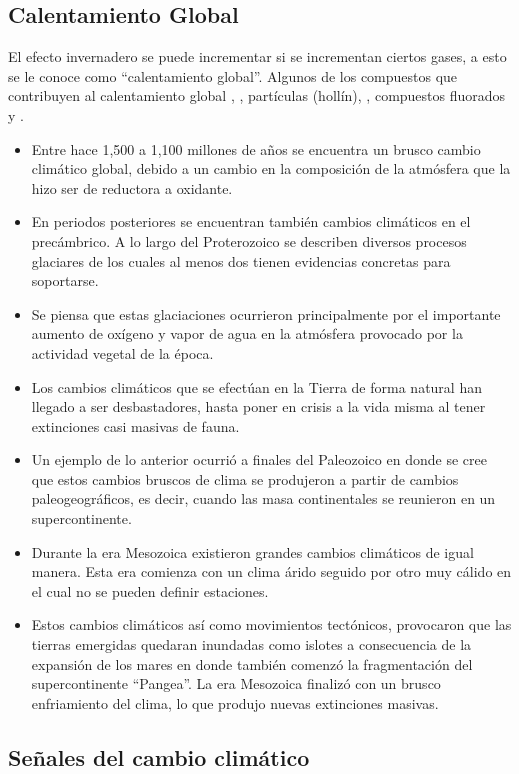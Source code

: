 \subsection{Calentamiento Global}
El efecto invernadero se puede incrementar si se incrementan ciertos gases, a esto se le conoce como ``calentamiento global''.
Algunos de los compuestos que contribuyen al calentamiento global  , , partículas (hollín), , compuestos fluorados y .
\begin{itemize}
\item  Entre hace 1,500 a 1,100 millones de años se encuentra un brusco cambio climático global, debido a un cambio en la composición de la atmósfera que la hizo ser de reductora a oxidante.
\item  En periodos posteriores se encuentran también cambios climáticos en el precámbrico. A lo largo del Proterozoico se describen diversos procesos glaciares de los cuales al menos dos tienen evidencias concretas para soportarse. 
\item  Se piensa que estas glaciaciones ocurrieron principalmente por el importante aumento de oxígeno y vapor de agua en la atmósfera provocado por la actividad vegetal de la época. 
\item  Los cambios climáticos que se efectúan en la Tierra de forma natural han llegado a ser desbastadores, hasta poner en crisis a la vida misma al tener extinciones casi masivas de fauna.
\item  Un ejemplo de lo anterior ocurrió a finales del Paleozoico en donde se cree que estos cambios bruscos de clima se produjeron a partir de cambios paleogeográficos, es decir, cuando las masa continentales se reunieron en un supercontinente.
\item  Durante la era Mesozoica existieron grandes cambios climáticos de igual manera. Esta era comienza con un clima árido seguido por otro muy cálido en el cual no se pueden definir estaciones. 
\item  Estos cambios climáticos así como movimientos tectónicos, provocaron que las tierras emergidas quedaran inundadas como islotes a consecuencia de la expansión de los mares en donde también comenzó la fragmentación del supercontinente ``Pangea''. La era Mesozoica finalizó con un brusco enfriamiento del clima, lo que produjo nuevas extinciones masivas.
\end{itemize}

\subsection{Señales del cambio climático}

